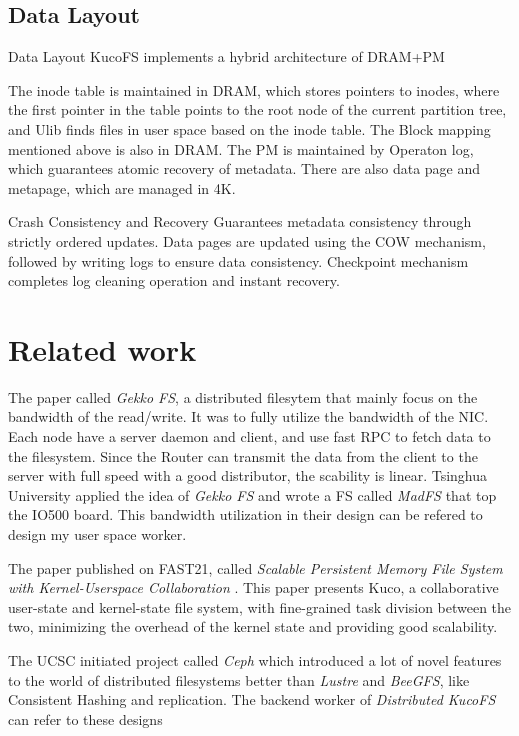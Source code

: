 \documentclass[acmtog]{acmart}
\begin{document}
\subsection{Data Layout}
Data Layout
KucoFS implements a hybrid architecture of DRAM+PM

The inode table is maintained in DRAM, which stores pointers to inodes, where the first pointer in the table points to the root node of the current partition tree, and Ulib finds files in user space based on the inode table. The Block mapping mentioned above is also in DRAM.
The PM is maintained by Operaton log, which guarantees atomic recovery of metadata. There are also data page and metapage, which are managed in 4K.

Crash Consistency and Recovery
Guarantees metadata consistency through strictly ordered updates.
Data pages are updated using the COW mechanism, followed by writing logs to ensure data consistency.
Checkpoint mechanism completes log cleaning operation and instant recovery.

\section{Related work}
The paper called \textit{Gekko FS}, a distributed filesytem that mainly focus on the bandwidth of the read/write. It was to fully utilize the bandwidth of the NIC. Each node have a server daemon and client, and use fast RPC to fetch data to the filesystem. Since the Router can transmit the data from the client to the server with full speed with a good distributor, the scability is linear. Tsinghua University applied the idea of \textit{Gekko FS} and wrote a FS called \textit{MadFS} that top the IO500 board. This bandwidth utilization in their design can be refered to design my user space worker.

The paper published on FAST21, called \textit{Scalable Persistent Memory File System with Kernel-Userspace Collaboration} \cite{chen2021scalable}. This paper presents Kuco, a collaborative user-state and kernel-state file system, with fine-grained task division between the two, minimizing the overhead of the kernel state and providing good scalability.

The UCSC initiated project called \textit{Ceph} which introduced a lot of novel features to the world of distributed filesystems better than \textit{Lustre} and \textit{BeeGFS}, like Consistent Hashing and replication. The backend worker of \textit{Distributed KucoFS} can refer to these designs



\end{document}

